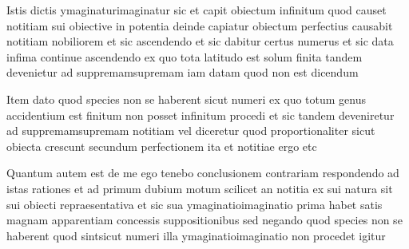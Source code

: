 \documentclass[twoside, openright]{report}
\begin{document}
        \pstart
        Istis dictis ymaginaturimaginatur sic et capit obiectum infinitum quod causet notitiam sui obiective in potentia  deinde capiatur obiectum perfectius causabit notitiam nobiliorem et sic ascendendo et sic dabitur certus numerus et sic data infima continue ascendendo ex quo tota latitudo est solum finita tandem devenietur ad suppremamsupremam iam datam quod non est dicendum
        \pend
     
        \pstart
        Item dato quod species non se haberent sicut numeri ex quo totum genus accidentium est finitum non posset infinitum procedi et sic tandem deveniretur ad suppremamsupremam notitiam vel diceretur quod proportionaliter sicut obiecta crescunt secundum perfectionem ita et notitiae ergo etc
        \pend
     
        \pstart
        Quantum autem est de me ego tenebo conclusionem contrariam respondendo ad istas rationes et ad primum dubium motum scilicet an notitia ex sui natura sit sui obiecti repraesentativa et sic sua ymaginatioimaginatio prima habet satis magnam apparentiam concessis suppositionibus  sed negando quod species non se haberent quod sintsicut numeri  illa ymaginatioimaginatio non procedet igitur
        \pend
        
        \endnumbering
        
     
        
\end{document}

